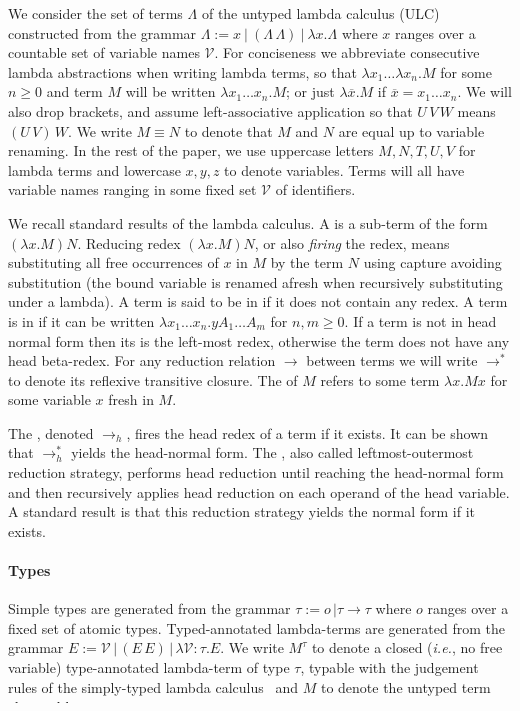 \documentclass{elsarticle}
\makeatletter
\theoremstyle{plain}
\theoremstyle{definition}
\newcommand\VarSet{\mathcal{V}}
\renewcommand\ie{{\it i.e.\@\xspace}}
\newcommand{\alphaequiv}{\equiv}
\makeatother
\begin{document}
We consider the set of terms $\Lambda$ of the untyped lambda calculus (ULC) constructed from the grammar $\Lambda := x\ |\ (\Lambda\, \Lambda)\ |\ \lambda x. \Lambda $
where $x$ ranges over a countable set of variable names $\VarSet$.
For conciseness we abbreviate consecutive lambda abstractions when writing lambda terms, so that $\lambda x_1 \ldots \lambda x_n . M$ for some $n\geq 0$ and term $M$ will be written $\lambda x_1 \ldots x_n . M$; or just
$\lambda \overline{x} . M$ if $\overline{x} = x_1 \ldots x_n$.
We will also drop brackets, and assume left-associative application so that $U\,V\,W$ means $(U\,V)\,W$. We write $M \alphaequiv N$ to denote that $M$ and $N$ are equal up to variable renaming.
In the rest of the paper, we use uppercase letters $M, N, T, U, V$ for lambda terms and lowercase $x,y,z$ to denote variables. Terms will all have variable names ranging in some fixed set $\VarSet$ of identifiers.

We recall standard results of the lambda calculus.
A  is a sub-term of the form $(\lambda x. M) N$.
Reducing redex $(\lambda x. M) N$, or also \emph{firing} the redex, means substituting all free occurrences of $x$ in $M$ by the term $N$ using capture avoiding substitution (the bound variable is renamed afresh when recursively substituting under a lambda).
A term is said to be in  if it does not contain any redex.
A term is in  if it can be written $\lambda x_1 \ldots x_n . y A_1 \ldots A_m$ for $n,m\geq0$. If a term is not in head normal form then its  is the left-most redex, otherwise the term does not have any head beta-redex. For any reduction relation $\rightarrow$ between terms we will write $\rightarrow^*$ to denote its reflexive transitive closure. The  of $M$ refers to some term $\lambda x. M x $ for some variable $x$ fresh in $M$.

The , denoted $\rightarrow_{h}$, fires the head redex of a term if it exists. It can be shown that $\rightarrow^*_{h}$ yields the head-normal form. The , also called leftmost-outermost reduction strategy, performs head reduction until reaching the head-normal form and then recursively applies head reduction on each operand of the head variable. A standard result is that this reduction strategy yields the normal form if it exists.

\paragraph{Types} Simple types are generated from the grammar $\tau := o\, | \tau \rightarrow \tau$ where $o$ ranges over a fixed set of atomic types. Typed-annotated lambda-terms are generated from the grammar $E := \VarSet\, |\, (E\, E)\, |\, \lambda \VarSet \colon\tau. E $.
We write $M^\tau$ to denote a closed (\ie, no free variable)
type-annotated lambda-term of type $\tau$, typable with the judgement rules of the simply-typed lambda calculus~\cite{Barendregt84} and $M$ to denote the untyped term obtained by erasing its type annotations.
\end{document}

